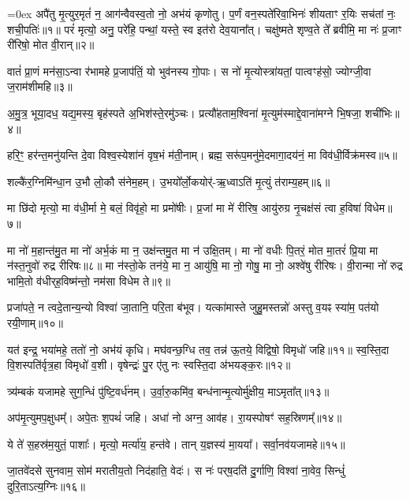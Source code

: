\let\oldparskip\parskip
\parskip=0ex
अपै॑तु मृ॒त्युर॒मृतं॑ न॒ आग॑न्वैवस्व॒तो नो॒ अभ॑यं कृणोतु।
प॒र्णं वन॒स्पते॑रिवा॒भिनः॑ शीयताꣳ र॒यिः सच॑तां नः॒ शची॒पतिः॑॥१॥
परं॑ मृत्यो॒ अनु॒ परे॑हि॒ पन्थां॒ यस्ते॒ स्व इत॑रो देव॒याना᳚त्।
चक्षु॑ष्मते शृण्व॒ते ते᳚ ब्रवीमि॒ मा नः॑ प्र॒जाꣳ री॑रिषो॒ मोत वी॒रान्॥२॥

वातं॑ प्रा॒णं मन॑सा॒ऽन्वा र॑भामहे प्र॒जाप॑तिं॒ यो भुव॑नस्य गो॒पाः।
स नो॑ मृ॒त्योस्त्रा॑यतां॒ पात्वꣳह॑सो॒ ज्योग्जी॒वा ज॒राम॑शीमहि॥३॥

अ॒मु॒त्र॒ भूया॒दध॒ यद्य॒मस्य॒ बृह॑स्पते अ॒भिश॑स्ते॒रमु॑ञ्चः।
प्रत्यौ॑हताम॒श्विना॑ मृ॒त्युम॑स्माद्दे॒वाना॑मग्ने भि॒षजा॒ शची॑भिः॥४॥

हरि॒ꣳ॒ हर॑न्त॒मनु॑यन्ति दे॒वा विश्व॒स्येशा॑नं वृष॒भं म॑ती॒नाम्।
ब्रह्म॒ सरू॑प॒मनु॑मे॒दमागा॒दय॑नं॒ मा विव॑धी॒र्विक्र॑मस्व॥५॥

शल्कै॑र॒ग्निमि॑न्धा॒न उ॒भौ लो॒कौ स॑नेम॒हम्।
उ॒भयो᳚र्लो॒कयोर्॑-ऋ॒ध्वाऽति॑ मृ॒त्युं त॑राम्य॒हम्॥६॥

मा छि॑दो मृत्यो॒ मा व॑धी॒र्मा मे॒ बलं॒ विवृ॑हो॒ मा प्रमो॑षीः।
प्र॒जां मा मे॑ रीरिष॒ आयु॑रुग्र नृ॒चक्ष॑सं त्वा ह॒विषा॑ विधेम॥७॥

मा नो॑ म॒हान्त॑मु॒त मा नो॑ अर्भ॒कं मा न॒ उक्ष॑न्तमु॒त मा न॑ उक्षि॒तम्।
 मा नो॑ वधीः पि॒तरं॒ मोत मा॒तरं॑ प्रि॒या मा न॑स्त॒नुवो॑ रुद्र रीरिषः॥८॥
 मा न॑स्तो॒के तन॑ये॒ मा न॒ आयु॑षि॒ मा नो॒ गोषु॒ मा नो॒ अश्वे॑षु रीरिषः।
 वी॒रान्मा नो॑ रुद्र भामि॒तो व॑धीर्‌ह॒विष्म॑न्तो॒ नम॑सा विधेम ते॥९॥

प्रजा॑पते॒ न त्वदे॒तान्य॒न्यो विश्वा॑ जा॒तानि॒ परि॒ता ब॑भूव।
यत्का॑मास्ते जुहु॒मस्तन्नो॑ अस्तु व॒यꣴ स्या॑म॒ पत॑यो रयी॒णाम्॥१०॥

यत॑ इन्द्र॒ भया॑महे॒ ततो॑ नो॒ अभ॑यं कृधि।
मघ॑वन्छ॒ग्धि तव॒ तन्न॑ ऊ॒तये॒ विद्विषो॒ विमृधो॑ जहि॥११॥
स्व॒स्ति॒दा वि॒शस्पति॑र्वृत्र॒हा विमृधो॑ व॒शी।
वृषेन्द्रः॑ पु॒र ए॑तु नः स्वस्ति॒दा अ॑भयङ्क॒रः॥१२॥

त्र्य॑म्बकं यजामहे सुग॒न्धिं पु॑ष्टि॒वर्ध॑नम्।
 उ॒र्वा॒रु॒कमि॑व॒ बन्ध॑नान्मृ॒त्योर्मु॑क्षीय॒ माऽमृता᳚त्॥१३॥

अप॑मृ॒त्युमप॒क्षुधम्᳚।   अपे॒तः श॒पथं॑ जहि।
अधा॑ नो अग्न॒ आव॑ह।   रा॒यस्पोषꣳ॑ सह॒स्रिणम्᳚॥१४॥

ये ते॑ स॒हस्र॑म॒युतं॒ पाशाः᳚।   मृत्यो॒ मर्त्या॑य॒ हन्त॑वे।
तान् य॒ज्ञस्य॑ मा॒यया᳚।   सर्वा॒नव॑यजामहे॥१५॥

जा॒तवे॑दसे सुनवाम॒ सोम॑ मरातीय॒तो निद॑हाति॒ वेदः॑।
स नः॑ पर्‌ष॒दति॑ दु॒र्गाणि॒ विश्वा॑ ना॒वेव॒ सिन्धुं॑ दुरि॒ताऽत्य॒ग्निः॥१६॥

